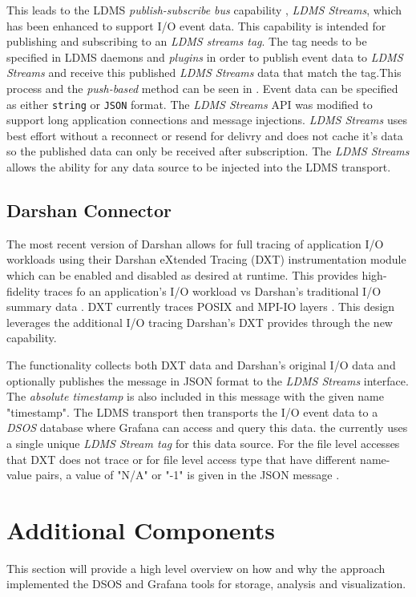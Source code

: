 \documentclass[conference]{IEEEtran}
\begin{document}
This leads to the LDMS \emph{publish-subscribe bus} capability , \emph{LDMS Streams}, which has been enhanced to support I/O event data. This capability is intended for publishing and subscribing to an \emph{LDMS streams tag}. The tag needs to be specified in LDMS daemons and \emph{plugins} in order to publish event data to \emph{LDMS Streams} and receive this published \emph{LDMS Streams} data that match the tag.This process and the \emph{push-based} method can be seen in . Event data can be specified as either \texttt{string} or \texttt{JSON} format. The \emph{LDMS Streams} API was modified to support long application connections and message injections. \emph{LDMS Streams} uses best effort without a reconnect or resend for delivry and does not cache it's data so the published data can only be received after subscription. The \emph{LDMS Streams} allows the ability for any data source to be injected into the LDMS transport.

\subsection{Darshan Connector}

The most recent version of Darshan allows for full tracing of application I/O workloads using their Darshan eXtended Tracing (DXT) instrumentation module which can be enabled and disabled as desired at runtime. This provides high-fidelity traces fo an application's I/O workload vs Darshan's traditional I/O summary data . DXT currently traces POSIX and MPI-IO layers . This design leverages the additional I/O tracing Darshan's DXT provides through the new \connector capability.


The \connector functionality collects both DXT data and Darshan's original I/O data and optionally publishes the message in JSON format to the \emph{LDMS Streams} interface. The \emph{absolute timestamp} is also included in this message with the given name "timestamp". The LDMS transport then transports the I/O event data to a \emph{DSOS} database where Grafana can access and query this data. the \connector currently uses a single unique \emph{LDMS Stream tag} for this data source. For the file level accesses that DXT does not trace or for file level access type that have different name-value pairs, a value of "N/A" or "-1" is given in the JSON message .

\section{Additional Components}
This section will provide a high level overview on how and why the \Darshan approach implemented the DSOS and Grafana tools for storage, analysis and visualization. 
\end{document}
